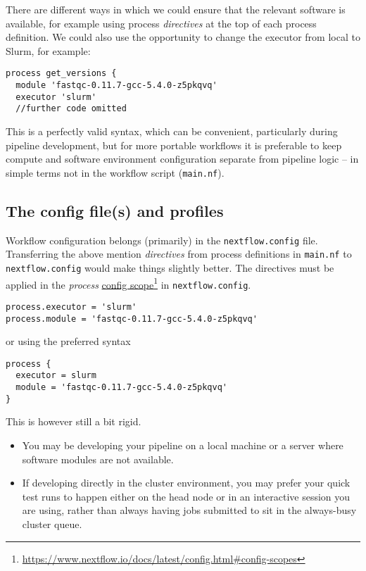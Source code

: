 There are different ways in which we could ensure that the relevant software is available, for example using process 
\emph{directives} at the top of each process definition. We could also use the opportunity to change the executor from local to Slurm, for example:
\begin{lstlisting}
process get_versions {
  module 'fastqc-0.11.7-gcc-5.4.0-z5pkqvq' 
  executor 'slurm' 
  //further code omitted 
\end{lstlisting}

This is a perfectly valid syntax, which can be convenient, particularly during pipeline development, 
but for more portable workflows it is preferable to keep compute and software environment configuration 
separate from pipeline logic -- in simple terms not in the workflow script (\texttt{main.nf}).


\subsection{The config file(s) and profiles}

Workflow configuration belongs (primarily) in the \texttt{nextflow.config} file. 
Transferring the above mention \emph{directives} from process definitions in \texttt{main.nf} 
to \texttt{nextflow.config} would make things slightly better. The directives must be applied 
in the \emph{process} \href{https://www.nextflow.io/docs/latest/config.html#config-scopes}{config scope}\footnote{\url{https://www.nextflow.io/docs/latest/config.html\#config-scopes}} in \texttt{nextflow.config}.


\begin{lstlisting}
process.executor = 'slurm' 
process.module = 'fastqc-0.11.7-gcc-5.4.0-z5pkqvq' 
\end{lstlisting}

or using the preferred syntax

\begin{lstlisting}
process {
  executor = slurm
  module = 'fastqc-0.11.7-gcc-5.4.0-z5pkqvq'
}
\end{lstlisting}


This is however still a bit rigid. 
\begin{itemize}
\item You may be developing your pipeline on a local machine or a server where software modules are not available. 
\item If developing directly in the cluster environment, you may prefer your quick test runs to happen either on the head node or in an interactive session you are using, rather than always having jobs submitted to sit in the always-busy cluster queue.
\end{itemize}


